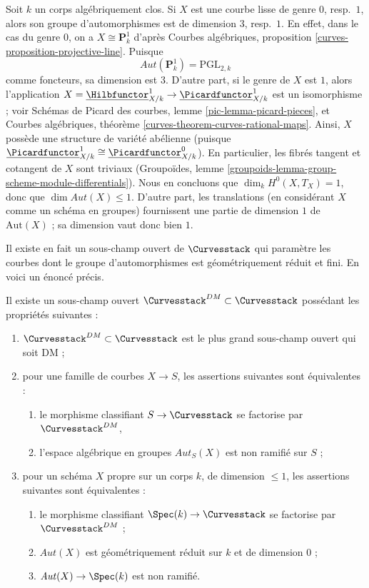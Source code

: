 \begin{example}
\label{example-pos-dim}
Soit $k$ un corps algébriquement clos. Si $X$ est une courbe lisse
de genre $0$, resp.\ $1$, alors son groupe d'automorphismes est de
dimension $3$, resp.\ $1$. En effet, dans le cas du genre $0$, on a
$X \cong \mathbf{P}^1_k$ d'après Courbes algébriques, proposition
\ref{curves-proposition-projective-line}. Puisque
$$
\mathit{Aut}(\mathbf{P}^1_k) = \text{PGL}_{2, k}
$$
comme foncteurs, sa dimension est $3$. D'autre part,
si le genre de $X$ est $1$, alors l'application
$X = \underline{\Hilbfunctor}^1_{X/k} \to
\underline{\Picardfunctor}^1_{X/k}$ est un isomorphisme ; voir
Schémas de Picard des courbes, lemme \ref{pic-lemma-picard-pieces},
et Courbes algébriques, théorème
\ref{curves-theorem-curves-rational-maps}.
Ainsi, $X$ possède une structure de variété abélienne
(puisque $\underline{\Picardfunctor}^1_{X/k} \cong
\underline{\Picardfunctor}^0_{X/k}$).
En particulier, les fibrés tangent et cotangent de $X$ sont triviaux
(Groupoïdes, lemme \ref{groupoids-lemma-group-scheme-module-differentials}).
Nous en concluons que $\dim_k H^0(X, T_X) = 1$, donc que
$\dim \mathit{Aut}(X) \leq 1$. D'autre part, les translations
(en considérant $X$ comme un schéma en groupes) fournissent une partie
de dimension $1$ de $\text{Aut}(X)$ ; sa dimension vaut donc bien $1$.
\end{example}

\noindent
Il existe en fait un sous-champ ouvert de
$\Curvesstack$ qui paramètre les courbes dont le groupe d'automorphismes
est géométriquement réduit et fini.
En voici un énoncé précis.

\begin{lemma}
\label{lemma-DM-curves}
Il existe un sous-champ ouvert $\Curvesstack^{DM} \subset \Curvesstack$
possédant les propriétés suivantes :
\begin{enumerate}
\item $\Curvesstack^{DM} \subset \Curvesstack$ est le plus grand
sous-champ ouvert qui soit DM ;
\item pour une famille de courbes $X \to S$, les assertions suivantes
sont équivalentes :
\begin{enumerate}
\item le morphisme classifiant $S \to \Curvesstack$ se factorise par
$\Curvesstack^{DM}$,
\item l'espace algébrique en groupes $\mathit{Aut}_S(X)$ est non ramifié
sur $S$ ;
\end{enumerate}
\item pour un schéma $X$ propre sur un corps $k$, de dimension $\leq 1$,
les assertions suivantes sont équivalentes :
\begin{enumerate}
\item le morphisme classifiant $\Spec(k) \to \Curvesstack$ se factorise
par $\Curvesstack^{DM}$ ;
\item $\mathit{Aut}(X)$ est géométriquement réduit sur $k$ et
de dimension $0$ ;
\item $\mathit{Aut}(X) \to \Spec(k)$ est non ramifié.
\end{enumerate}
\end{enumerate}
\end{lemma}

